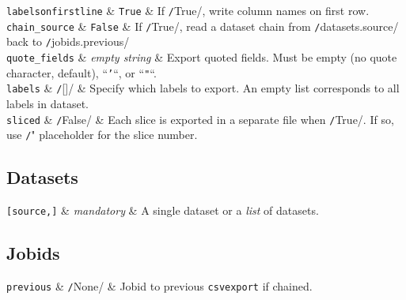   \RP \texttt{labelsonfirstline} & \texttt{True} & If
  \texttt/True/, write column names on first row.\\[1ex]
  
  \RP \texttt{chain\_source} & \texttt{False} & If
  \texttt/True/, read a dataset chain from
  \texttt/datasets.source/ back to
  \texttt/jobids.previous/\\[1ex]

  \RP \texttt{quote\_fields} & \textsl{empty string} & Export quoted fields.  Must be empty
  (no quote character, default), ``\texttt{'}``, or ``\texttt{"}``.\\[1ex]
  
  \RP \texttt{labels} & \texttt/[]/ & Specify which labels to
  export.  An empty list corresponds to all labels in dataset.\\[1ex]
  
  \RP \texttt{sliced} & \texttt/False/ & Each slice is
  exported in a separate file when \texttt/True/.  If so,
  use \texttt/"%
  placeholder for the slice number.\\[1ex]
\stoptable

\subsection*{Datasets}
\starttable
  \RP \texttt{[source,]} & \textsl{mandatory} & A single
  dataset or a \textsl{list} of datasets.\\[1ex]
\stoptable


\subsection*{Jobids}
\starttable
  \texttt{previous} & \texttt/None/ & Jobid to
  previous \texttt{csvexport} if chained.\\[1ex]
\stoptable

















